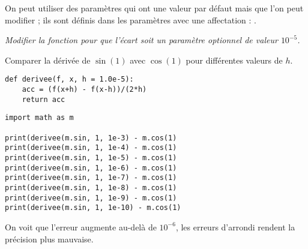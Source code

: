 On peut utiliser des paramètres qui ont une valeur par défaut mais que l'on peut modifier ; ils sont définis dans les paramètres avec une affectation : .
\begin{Exercise}[title={Dérivée à pas modifiable}]
\it Modifier la fonction  pour que l'écart soit un paramètre optionnel de valeur $10^{-5}$.

Comparer la dérivée de $\sin(1)$ avec $\cos(1)$ pour différentes valeurs de $h$.
\end{Exercise}
\begin{Answer}
\begin{lstlisting}
def derivee(f, x, h = 1.0e-5):
    acc = (f(x+h) - f(x-h))/(2*h)
    return acc
\end{lstlisting}

\begin{lstlisting}
import math as m

print(derivee(m.sin, 1, 1e-3) - m.cos(1)
print(derivee(m.sin, 1, 1e-4) - m.cos(1)
print(derivee(m.sin, 1, 1e-5) - m.cos(1)
print(derivee(m.sin, 1, 1e-6) - m.cos(1)
print(derivee(m.sin, 1, 1e-7) - m.cos(1)
print(derivee(m.sin, 1, 1e-8) - m.cos(1)
print(derivee(m.sin, 1, 1e-9) - m.cos(1)
print(derivee(m.sin, 1, 1e-10) - m.cos(1)
\end{lstlisting}

On voit que l'erreur augmente au-delà de $10^{-6}$, les erreurs d'arrondi rendent la précision plus mauvaise.
\end{Answer} 

\medskip

